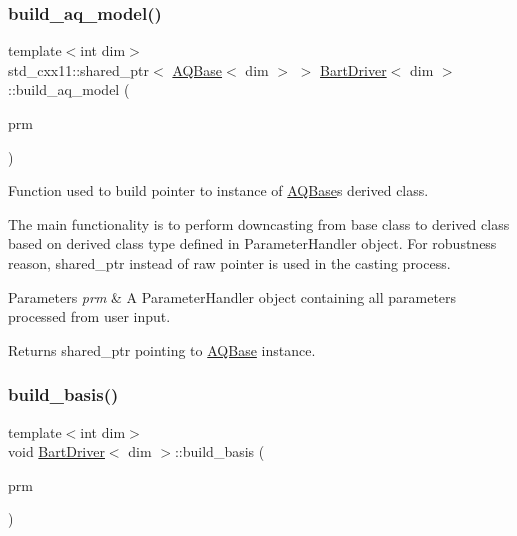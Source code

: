 \subsubsection{\texorpdfstring{build\+\_\+aq\+\_\+model()}{build\_aq\_model()}}
{\footnotesize\ttfamily template$<$int dim$>$ \\
std\+\_\+cxx11\+::shared\+\_\+ptr$<$ \hyperlink{class_a_q_base}{A\+Q\+Base}$<$ dim $>$ $>$ \hyperlink{class_bart_driver}{Bart\+Driver}$<$ dim $>$\+::build\+\_\+aq\+\_\+model (\begin{DoxyParamCaption}\item[{Parameter\+Handler \&}]{prm }\end{DoxyParamCaption})\hspace{0.3cm}{\ttfamily [private]}}



Function used to build pointer to instance of \hyperlink{class_a_q_base}{A\+Q\+Base}\textquotesingle{}s derived class. 

The main functionality is to perform downcasting from base class to derived class based on derived class type defined in Parameter\+Handler object. For robustness reason, shared\+\_\+ptr instead of raw pointer is used in the casting process.


\begin{DoxyParams}{Parameters}
{\em prm} & A Parameter\+Handler object containing all parameters processed from user input. \\
\hline
\end{DoxyParams}
\begin{DoxyReturn}{Returns}
shared\+\_\+ptr pointing to \hyperlink{class_a_q_base}{A\+Q\+Base} instance. 
\end{DoxyReturn}
\mbox{\label{class_bart_driver_ade375a4999de1e775434e11d4e6dd935}} 
\subsubsection{\texorpdfstring{build\+\_\+basis()}{build\_basis()}}
{\footnotesize\ttfamily template$<$int dim$>$ \\
void \hyperlink{class_bart_driver}{Bart\+Driver}$<$ dim $>$\+::build\+\_\+basis (\begin{DoxyParamCaption}\item[{Parameter\+Handler \&}]{prm }\end{DoxyParamCaption})\hspace{0.3cm}{\ttfamily [private]}}

